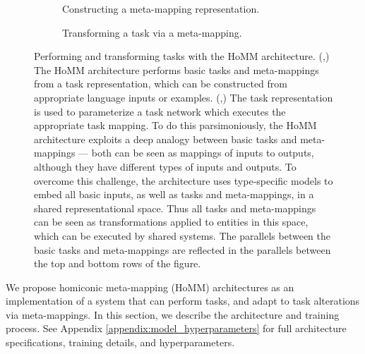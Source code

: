 \begin{figure}[htbp]
\begin{tikzpicture}[auto]
\end{tikzpicture}
\begin{subfigure}{0.5\textwidth}
\caption{Constructing a meta-mapping representation.}\label{fig:HoMM_architecture:constructing_meta}
\end{subfigure}%
\begin{subfigure}{0.5\textwidth}
\caption{Transforming a task via a meta-mapping.}\label{fig:HoMM_architecture:performing_meta}
\end{subfigure}
\caption[Performing and transforming tasks with the HoMM architecture.]{Performing and transforming tasks with the HoMM architecture. (,) The HoMM architecture performs basic tasks and meta-mappings from a task representation, which can be constructed from appropriate language inputs or examples. (,) The task representation is used to parameterize a task network which executes the appropriate task mapping. To do this parsimoniously, the HoMM architecture exploits a deep analogy between basic tasks and meta-mappings --- both can be seen as mappings of inputs to outputs, although they have different types of inputs and outputs. To overcome this challenge, the architecture uses type-specific models to embed all basic inputs, as well as tasks and meta-mappings, in a shared representational space. Thus all tasks and meta-mappings can be seen as transformations applied to entities in this space, which can be executed by shared systems. The parallels between the basic tasks and meta-mappings are reflected in the parallels between the top and bottom rows of the figure.} \label{fig:HoMM_architecture}
\end{figure}

We propose homiconic meta-mapping (HoMM) architectures as an implementation of a system that can perform tasks, and adapt to task alterations via meta-mappings. In this section, we describe the architecture and training process. See Appendix \ref{appendix:model_hyperparameters} for full architecture specifications, training details, and hyperparameters. 

